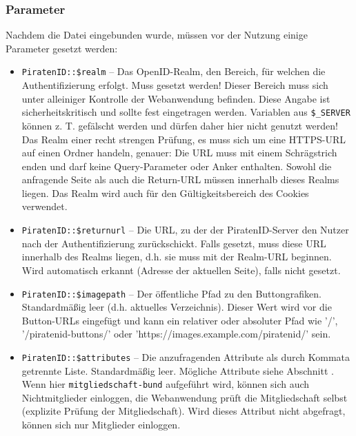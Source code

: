 \subsubsection{Parameter}
Nachdem die Datei eingebunden wurde, müssen vor der Nutzung einige Parameter gesetzt werden:
\begin{itemize}
	\item \texttt{PiratenID::\$realm} -- Das OpenID-Realm, den Bereich, für welchen die Authentifizierung erfolgt. Muss gesetzt werden!
										Dieser Bereich muss sich unter alleiniger Kontrolle der Webanwendung befinden.
										Diese Angabe ist sicherheitskritisch und sollte fest eingetragen werden.
										Variablen aus \texttt{\$\_SERVER} können z. T. gefälscht werden und dürfen daher hier nicht genutzt werden!
										Das Realm einer recht strengen Prüfung, es muss sich um eine HTTPS-URL auf einen Ordner handeln, genauer:
										Die URL muss mit einem Schrägstrich enden und darf keine Query-Parameter oder Anker enthalten.
										Sowohl die anfragende Seite als auch die Return-URL müssen innerhalb dieses Realms liegen.
										Das Realm wird auch für den Gültigkeitsbereich des Cookies verwendet.
										
	\item \texttt{PiratenID::\$returnurl} -- Die URL, zu der der PiratenID-Server den Nutzer nach der Authentifizierung zurückschickt.
											Falls gesetzt, muss diese URL innerhalb des Realms liegen, d.h. sie muss mit der Realm-URL beginnen.
											Wird automatisch erkannt (Adresse der aktuellen Seite), falls nicht gesetzt.

	\item \texttt{PiratenID::\$imagepath} -- Der öffentliche Pfad zu den Buttongrafiken. Standardmäßig leer (d.h. aktuelles Verzeichnis).
											Dieser Wert wird vor die Button-URLs eingefügt und kann ein relativer oder absoluter Pfad wie '/',
											'/piratenid-buttons/' oder 'https://images.example.com/piratenid/' sein.

	\item \texttt{PiratenID::\$attributes} -- Die anzufragenden Attribute als durch Kommata getrennte Liste. Standardmäßig leer.
											Mögliche Attribute siehe Abschnitt .
											Wenn hier  \texttt{mitgliedschaft-bund} aufgeführt wird, können sich auch Nichtmitglieder einloggen,
											die Webanwendung prüft die Mitgliedschaft selbst (explizite Prüfung der Mitgliedschaft).
											Wird dieses Attribut nicht abgefragt, können sich nur Mitglieder einloggen.


\end{itemize}
